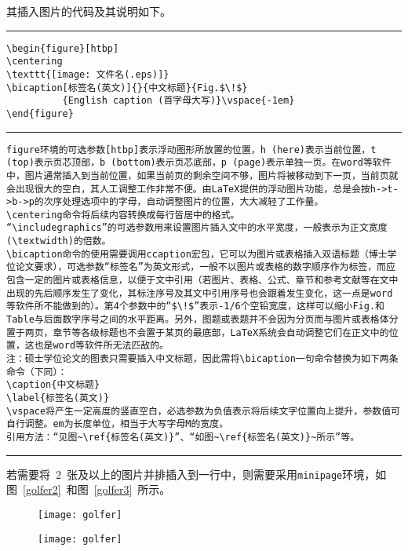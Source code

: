 其插入图片的代码及其说明如下。
\vspace{1em}\noindent\hrule
\begin{verbatim}
\begin{figure}[htbp]
\centering
\texttt{[image: 文件名(.eps)]}
\bicaption[标签名(英文)]{}{中文标题}{Fig.$\!$}
          {English caption (首字母大写)}\vspace{-1em}
\end{figure}
\end{verbatim}
\noindent\hrule
\begin{verbatim}
figure环境的可选参数[htbp]表示浮动图形所放置的位置，h (here)表示当前位置，t (top)表示页芯顶部，b (bottom)表示页芯底部，p (page)表示单独一页。在word等软件中，图片通常插入到当前位置，如果当前页的剩余空间不够，图片将被移动到下一页，当前页就会出现很大的空白，其人工调整工作非常不便。由LaTeX提供的浮动图片功能，总是会按h->t->b->p的次序处理选项中的字母，自动调整图片的位置，大大减轻了工作量。
\centering命令将后续内容转换成每行皆居中的格式。
“\includegraphics”的可选参数用来设置图片插入文中的水平宽度，一般表示为正文宽度(\textwidth)的倍数。
\bicaption命令的使用需要调用ccaption宏包，它可以为图片或表格插入双语标题（博士学位论文要求），可选参数“标签名”为英文形式，一般不以图片或表格的数字顺序作为标签，而应包含一定的图片或表格信息，以便于文中引用（若图片、表格、公式、章节和参考文献等在文中出现的先后顺序发生了变化，其标注序号及其文中引用序号也会跟着发生变化，这一点是word等软件所不能做到的）。第4个参数中的“$\!$”表示-1/6个空铅宽度，这样可以缩小Fig.和Table与后面数字序号之间的水平距离。另外，图题或表题并不会因为分页而与图片或表格体分置于两页，章节等各级标题也不会置于某页的最底部，LaTeX系统会自动调整它们在正文中的位置，这也是word等软件所无法匹敌的。
注：硕士学位论文的图表只需要插入中文标题，因此需将\bicaption一句命令替换为如下两条命令（下同）：
\caption{中文标题}
\label{标签名(英文)}
\vspace将产生一定高度的竖直空白，必选参数为负值表示将后续文字位置向上提升，参数值可自行调整。em为长度单位，相当于大写字母M的宽度。
引用方法：“见图~\ref{标签名(英文)}”、“如图~\ref{标签名(英文)}~所示”等。
\end{verbatim}
\noindent\hrule\vspace{1em}
若需要将~2~张及以上的图片并排插入到一行中，则需要采用\verb|minipage|环境，如图~\ref{golfer2}~和图~\ref{golfer3}~所示。
\begin{figure}[htbp]
\centering
\begin{minipage}{0.4\textwidth}
\centering
\texttt{[image: golfer]}
\end{minipage}
\begin{minipage}{0.4\textwidth}
\centering
\texttt{[image: golfer]}
\end{minipage}\vspace{-1em}
\end{figure}

